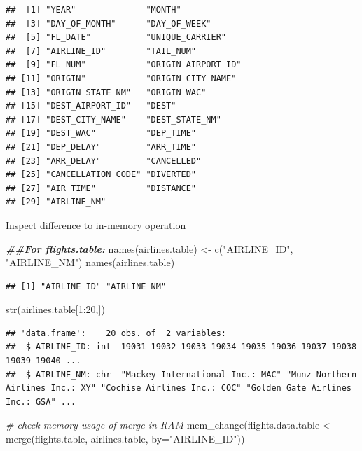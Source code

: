 \documentclass[
  12pt,
]{style/krantz}
\newenvironment{Shaded}{\begin{snugshade}}{\end{snugshade}}
\newcommand{\AttributeTok}[1]{\textcolor[rgb]{0.77,0.63,0.00}{#1}}
\newcommand{\CommentTok}[1]{\textcolor[rgb]{0.56,0.35,0.01}{\textit{#1}}}
\newcommand{\DecValTok}[1]{\textcolor[rgb]{0.00,0.00,0.81}{#1}}
\newcommand{\DocumentationTok}[1]{\textcolor[rgb]{0.56,0.35,0.01}{\textbf{\textit{#1}}}}
\newcommand{\FunctionTok}[1]{\textcolor[rgb]{0.00,0.00,0.00}{#1}}
\newcommand{\NormalTok}[1]{#1}
\newcommand{\OtherTok}[1]{\textcolor[rgb]{0.56,0.35,0.01}{#1}}
\newcommand{\SpecialCharTok}[1]{\textcolor[rgb]{0.00,0.00,0.00}{#1}}
\newcommand{\StringTok}[1]{\textcolor[rgb]{0.31,0.60,0.02}{#1}}
\begin{document}
\begin{verbatim}
##  [1] "YEAR"              "MONTH"            
##  [3] "DAY_OF_MONTH"      "DAY_OF_WEEK"      
##  [5] "FL_DATE"           "UNIQUE_CARRIER"   
##  [7] "AIRLINE_ID"        "TAIL_NUM"         
##  [9] "FL_NUM"            "ORIGIN_AIRPORT_ID"
## [11] "ORIGIN"            "ORIGIN_CITY_NAME" 
## [13] "ORIGIN_STATE_NM"   "ORIGIN_WAC"       
## [15] "DEST_AIRPORT_ID"   "DEST"             
## [17] "DEST_CITY_NAME"    "DEST_STATE_NM"    
## [19] "DEST_WAC"          "DEP_TIME"         
## [21] "DEP_DELAY"         "ARR_TIME"         
## [23] "ARR_DELAY"         "CANCELLED"        
## [25] "CANCELLATION_CODE" "DIVERTED"         
## [27] "AIR_TIME"          "DISTANCE"         
## [29] "AIRLINE_NM"
\end{verbatim}

Inspect difference to in-memory operation

\begin{Shaded}
\begin{Highlighting}[]
\DocumentationTok{\#\#For flights.table:}
\FunctionTok{names}\NormalTok{(airlines.table) }\OtherTok{\textless{}{-}} \FunctionTok{c}\NormalTok{(}\StringTok{"AIRLINE\_ID"}\NormalTok{, }\StringTok{"AIRLINE\_NM"}\NormalTok{)}
\FunctionTok{names}\NormalTok{(airlines.table)}
\end{Highlighting}
\end{Shaded}

\begin{verbatim}
## [1] "AIRLINE_ID" "AIRLINE_NM"
\end{verbatim}

\begin{Shaded}
\begin{Highlighting}[]
\FunctionTok{str}\NormalTok{(airlines.table[}\DecValTok{1}\SpecialCharTok{:}\DecValTok{20}\NormalTok{,])}
\end{Highlighting}
\end{Shaded}

\begin{verbatim}
## 'data.frame':    20 obs. of  2 variables:
##  $ AIRLINE_ID: int  19031 19032 19033 19034 19035 19036 19037 19038 19039 19040 ...
##  $ AIRLINE_NM: chr  "Mackey International Inc.: MAC" "Munz Northern Airlines Inc.: XY" "Cochise Airlines Inc.: COC" "Golden Gate Airlines Inc.: GSA" ...
\end{verbatim}

\begin{Shaded}
\begin{Highlighting}[]
\CommentTok{\# check memory usage of merge in RAM }
\FunctionTok{mem\_change}\NormalTok{(flights.data.table }\OtherTok{\textless{}{-}} \FunctionTok{merge}\NormalTok{(flights.table,}
\NormalTok{                                       airlines.table,}
                                       \AttributeTok{by=}\StringTok{"AIRLINE\_ID"}\NormalTok{))}
\end{Highlighting}
\end{Shaded}
\end{document}
